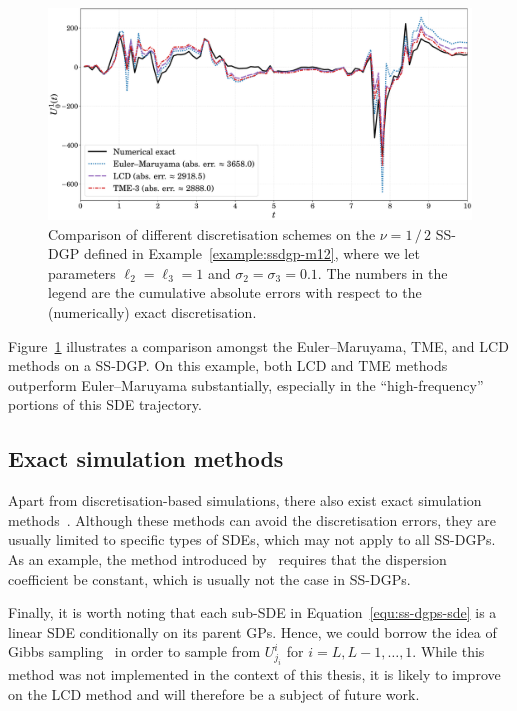 \begin{figure}[t!]
	\centering
	\includegraphics[width=.95\linewidth]{figs/disc-err_dgp_m12}
	\caption{Comparison of different discretisation schemes on the \matern $\nu=1\,/\,2$ SS-DGP defined in Example~\ref{example:ssdgp-m12}, where we let parameters $\ell_2=\ell_3=1$ and $\sigma_2=\sigma_3=0.1$. The numbers in the legend are the cumulative absolute errors with respect to the (numerically) exact discretisation.}
	\label{fig:disc-err-dgp-m12}
\end{figure}

Figure~\ref{fig:disc-err-dgp-m12} illustrates a comparison amongst the Euler--Maruyama, TME, and LCD methods on a \matern SS-DGP. On this example, both LCD and TME methods outperform Euler--Maruyama substantially, especially in the ``high-frequency'' portions of this SDE trajectory.

\subsection*{Exact simulation methods}

Apart from discretisation-based simulations, there also exist exact simulation methods~\citep{Beskos2005, Kessler2012, Blanchet2020}. Although these methods can avoid the discretisation errors, they are usually limited to specific types of SDEs, which may not apply to all SS-DGPs. As an example, the method introduced by~\citet{Beskos2005} requires that the dispersion coefficient be constant, which is usually not the case in SS-DGPs.

Finally, it is worth noting that each sub-SDE in Equation~\eqref{equ:ss-dgps-sde} is a linear SDE conditionally on its parent GPs. Hence, we could borrow the idea of Gibbs sampling~\citep{Robert2004} in order to sample from $U^i_{j_i}$ for $i=L,L-1,\ldots, 1$. While this method was not implemented in the context of this thesis, it is likely to improve on the LCD method and will therefore be a subject of future work.

